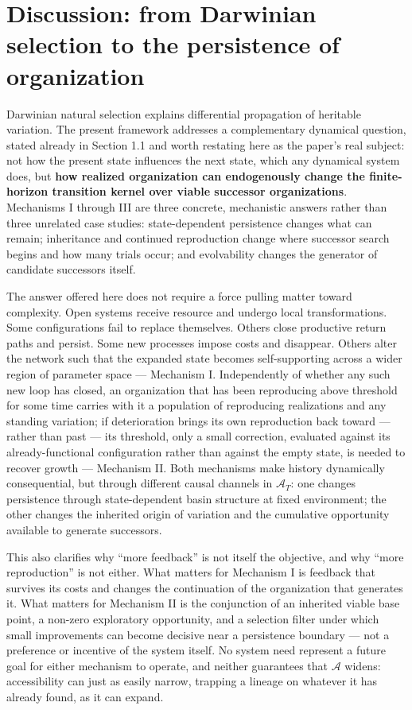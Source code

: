 \documentclass[11pt]{article}
\begin{document}
\section{Discussion: from Darwinian selection to the persistence of
organization}
Darwinian natural selection explains differential propagation of
heritable variation. The present framework addresses a complementary
dynamical question, stated already in Section 1.1 and worth restating
here as the paper's real subject: not how the present state influences
the next state, which any dynamical system does, but \textbf{how
realized organization can endogenously change the finite-horizon
transition kernel over viable successor organizations}. Mechanisms I
through III are three concrete, mechanistic answers rather than three
unrelated case studies: state-dependent persistence changes what can
remain; inheritance and continued reproduction change where successor
search begins and how many trials occur; and evolvability changes the
generator of candidate successors itself.

The answer offered here does not require a force pulling matter toward
complexity. Open systems receive resource and undergo local
transformations. Some configurations fail to replace themselves. Others
close productive return paths and persist. Some new processes impose
costs and disappear. Others alter the network such that the expanded
state becomes self-supporting across a wider region of parameter space
--- Mechanism I. Independently of whether any such new loop has closed,
an organization that has been reproducing above threshold for some time
carries with it a population of reproducing realizations and any
standing variation; if deterioration brings its own reproduction back
toward --- rather than past --- its threshold, only a small correction,
evaluated against its already-functional configuration rather than
against the empty state, is needed to recover growth --- Mechanism II.
Both mechanisms make history dynamically consequential, but through
different causal channels in \(\mathcal A_T\): one changes persistence
through state-dependent basin structure at fixed environment; the other
changes the inherited origin of variation and the cumulative opportunity
available to generate successors.

This also clarifies why ``more feedback'' is not itself the objective,
and why ``more reproduction'' is not either. What matters for Mechanism
I is feedback that survives its costs and changes the continuation of
the organization that generates it. What matters for Mechanism II is the
conjunction of an inherited viable base point, a non-zero exploratory
opportunity, and a selection filter under which small improvements can
become decisive near a persistence boundary --- not a preference or
incentive of the system itself. No system need represent a future goal
for either mechanism to operate, and neither guarantees that
\(\mathcal{A}\) widens: accessibility can just as easily narrow,
trapping a lineage on whatever it has already found, as it can expand.
\end{document}
